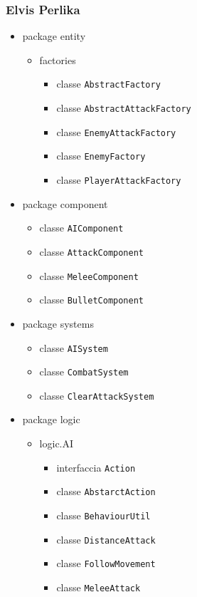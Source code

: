 \documentclass[a4paper,12pt]{report}
\begin{document}
\subsubsection{Elvis Perlika}

\begin{itemize}
	\item package entity
	\begin{itemize}
		\item factories
			\begin{itemize}
			\item classe \texttt{AbstractFactory}	
			\item classe \texttt{AbstractAttackFactory}
			\item classe \texttt{EnemyAttackFactory}
			\item classe \texttt{EnemyFactory}
			\item classe \texttt{PlayerAttackFactory}
			\end{itemize}
	\end{itemize}
	\item package component
		\begin{itemize}
			\item classe \texttt{AIComponent}
			\item classe \texttt{AttackComponent}
			\item classe \texttt{MeleeComponent}
			\item classe \texttt{BulletComponent}
		\end{itemize}
	\item package systems
		\begin{itemize}
			\item classe \texttt{AISystem}
			\item classe \texttt{CombatSystem}
			\item classe \texttt{ClearAttackSystem}
		\end{itemize}
	\item package logic
		\begin{itemize}
			\item logic.AI
				\begin{itemize}
				\item interfaccia \texttt{Action}
				\item classe \texttt{AbstarctAction}
				\item classe \texttt{BehaviourUtil}
				\item classe \texttt{DistanceAttack}
				\item classe \texttt{FollowMovement}
				\item classe \texttt{MeleeAttack}

\end{itemize}
\end{itemize}
\end{itemize}
\end{document}
